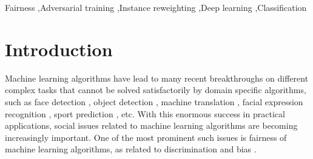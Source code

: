 \documentclass[preprint,12pt]{elsarticle}
\begin{document}
\begin{frontmatter}

\begin{keyword}
Fairness \sep Adversarial training \sep Instance reweighting  \sep Deep learning \sep Classification
\end{keyword}

\end{frontmatter}


\section{Introduction}
\label{Sec:Introduction}
Machine learning algorithms have lead to many recent breakthroughs on different complex tasks that cannot be solved satisfactorily by domain specific algorithms, such as face detection \cite{kumar2019face}, object detection \cite{voulodimos2018deep}, machine translation \cite{singh2017machine}, facial expression recognition
\cite{domadiya2019review}, sport prediction \cite{bunker2019machine}, etc. With this enormous success in practical applications, social issues related to machine learning algorithms are becoming increasingly important. One of the most prominent such issues is fairness of machine learning algorithms, as related to discrimination and bias \cite{hajian2016algorithmic}. 
\end{document}
